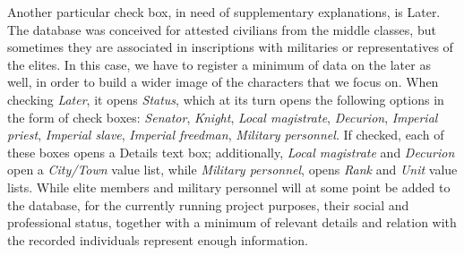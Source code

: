 \documentclass[amsthm,ebook]{saparticle}
\begin{document}
Another particular check box, in need of supplementary explanations, is Later. The database was conceived for attested
civilians from the middle classes, but sometimes they are associated in inscriptions with militaries or representatives
of the elites. In this case, we have to register a minimum of data on the later as well, in order to build a wider
image of the characters that we focus on. When checking \emph{Later}, it opens \emph{Status}, which at its turn opens the following
options in the form of check boxes: \emph{Senator}, \emph{Knight}, \emph{Local magistrate}, \emph{Decurion}, \emph{Imperial priest}, \emph{Imperial slave},
\emph{Imperial freedman}, \emph{Military personnel}. If checked, each of these boxes opens a Details text box; additionally, \emph{Local
magistrate} and \emph{Decurion} open a \emph{City/Town} value list, while \emph{Military personnel}, opens \emph{Rank} and \emph{Unit} value lists. While
elite members and military personnel will at some point be added to the database, for the currently running project
purposes, their social and professional status, together with a minimum of relevant details and relation with the
recorded individuals represent enough information. 
\newpage

\end{document}
